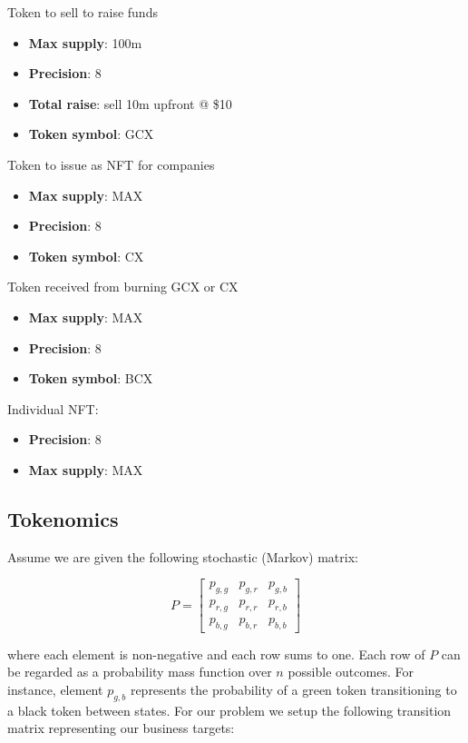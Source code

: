 \documentclass{article}
\begin{document}
Token to sell to raise funds
\begin{itemize}
\item \textbf{Max supply}: 100m
\item \textbf{Precision}: 8
\item \textbf{Total raise}: sell 10m upfront @ \$10
\item \textbf{Token symbol}: GCX
\end{itemize}

Token to issue as NFT for companies
\begin{itemize}
\item \textbf{Max supply}: MAX
\item \textbf{Precision}: 8
\item \textbf{Token symbol}: CX
\end{itemize}

Token received from burning GCX or CX
\begin{itemize}
\item \textbf{Max supply}: MAX
\item \textbf{Precision}: 8
\item \textbf{Token symbol}: BCX
\end{itemize}

Individual NFT:
\begin{itemize}
\item \textbf{Precision}: 8
\item \textbf{Max supply}: MAX
\end{itemize}

\subsection{Tokenomics}
\label{section:token_model}

Assume we are given the following stochastic (Markov) matrix:

\begin{equation*}
P = 
\begin{bmatrix}
p_{g,g} & p_{g,r}  & p_{g,b} \\
p_{r,g} & p_{r,r}  & p_{r,b} \\
p_{b,g} & p_{b,r} & p_{b,b} 
\end{bmatrix}
\end{equation*}

where each element is non-negative and each row sums to one. Each row of $P$ can be regarded as a probability mass function over $n$ possible outcomes. For instance, element $p_{g,b}$ represents the probability of a green token transitioning to a black token
between states. For our problem we setup the following transition matrix representing our business targets:
\end{document}
